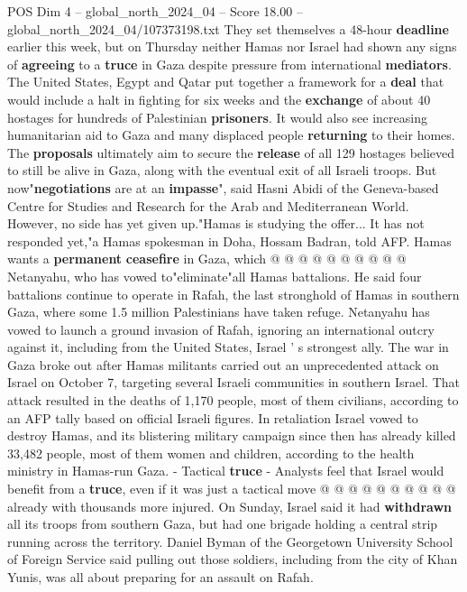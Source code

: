 \begin{textsample}{POS Dim 4 – global\_north\_2024\_04 – Score 18.00 – global\_north\_2024\_04/107373198.txt}  \label{ex:f4_pos_366}
They set themselves a 48-hour \textbf{deadline} earlier this week, but on Thursday neither Hamas nor Israel had shown any signs of \textbf{agreeing} to a \textbf{truce} in Gaza despite pressure from international \textbf{mediators}.
The United States, Egypt and Qatar put together a framework for a \textbf{deal} that would include a halt in fighting for six weeks and the \textbf{exchange} of about 40 hostages for hundreds of Palestinian \textbf{prisoners}.
It would also see increasing humanitarian aid to Gaza and many displaced people \textbf{returning} to their homes.
The \textbf{proposals} ultimately aim to secure the \textbf{release} of all 129 hostages believed to still be alive in Gaza, along with the eventual exit of all Israeli troops.
But now"\textbf{negotiations} are at an \textbf{impasse}", said Hasni Abidi of the Geneva-based Centre for Studies and Research for the Arab and Mediterranean World.
However, no side has yet given up."Hamas is studying the offer...
It has not responded yet,"a Hamas spokesman in Doha, Hossam Badran, told AFP.
Hamas wants a \textbf{permanent} \textbf{ceasefire} in Gaza, which @ @ @ @ @ @ @ @ @ @ Netanyahu, who has vowed to"eliminate"all Hamas battalions.
He said four battalions continue to operate in Rafah, the last stronghold of Hamas in southern Gaza, where some 1.5 million Palestinians have taken refuge.
Netanyahu has vowed to launch a ground invasion of Rafah, ignoring an international outcry against it, including from the United States, Israel ' s strongest ally.
The war in Gaza broke out after Hamas militants carried out an unprecedented attack on Israel on October 7, targeting several Israeli communities in southern Israel.
That attack resulted in the deaths of 1,170 people, most of them civilians, according to an AFP tally based on official Israeli figures.
In retaliation Israel vowed to destroy Hamas, and its blistering military campaign since then has already killed 33,482 people, most of them women and children, according to the health ministry in Hamas-run Gaza. - Tactical \textbf{truce} - Analysts feel that Israel would benefit from a \textbf{truce}, even if it was just a tactical move @ @ @ @ @ @ @ @ @ @ already with thousands more injured.
On Sunday, Israel said it had \textbf{withdrawn} all its troops from southern Gaza, but had one brigade holding a central strip running across the territory.
Daniel Byman of the Georgetown University School of Foreign Service said pulling out those soldiers, including from the city of Khan Yunis, was all about preparing for an assault on Rafah.

\end{textsample}
